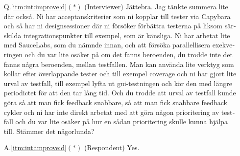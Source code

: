 \begin{otherlanguage}{swedish}
\begin{itemize}
  \item[Q.\ref{itm:int:improve:d}$(*)$] (Interviewer) Jättebra. Jag tänkte summera lite där också. Ni har acceptanskriterier som ni kopplar till tester via Capybara och så har ni designsessioner där ni försöker förbättra testerna på liksom särskilda integrationspunkter till exempel, som är känsliga. Ni har arbetat lite med SauceLabs, som du nämnde innan, och att försöka parallellisera exekveringen och du var lite osäker på om det fanns beroenden, du trodde inte det fanns några beroenden, mellan testfallen. Man kan använda lite verktyg som kollar efter överlappande tester och till exempel coverage och ni har gjort lite urval av testfall, till exempel lyfta ut gui-testningen och kör den med längre periodictet för att den tar lång tid. Och du trodde att urval av testfall kunde göra så att man fick feedback snabbare, så att man fick snabbare feedback cykler och ni har inte direkt arbetat med att göra någon prioritering av testfall och du var lite osäker på hur en sådan prioritering skulle kunna hjälpa till. Stämmer det någorlunda?
  \item[A.\ref{itm:int:improve:d}$(*)$] (Respondent) Yes.
\end{itemize}
\end{otherlanguage}